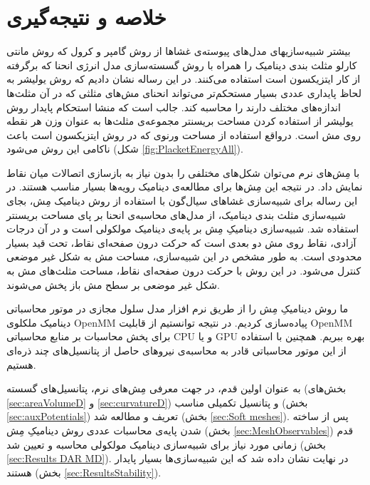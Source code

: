 \section{
خلاصه و نتیجه‌گیری
}
بیشتر شبیه‌سازیهای مدل‌های پیوسته‌ی غشاها از روش گامپر و کرول
\cite{gompper1996}
که  روش مانتی کارلو مثلث بندی دینامیک 
\cite{Boal1992PRA, Gompper1992Science}
را همراه با روش گسسته‌سازی مدل انرژی انحنا که برگرفته از کار ایتزیکسون
\cite{Itzykson1986}
است استفاده می‌کنند. در این رساله نشان دادیم که روش یولیشر
\cite{Julicher1996}
به لحاظ پایداری عددی بسیار مستحکم‌تر می‌تواند انحنای مش‌های مثلثی که در آن مثلث‌ها اندازه‌های مختلف دارند را محاسبه کند.  جالب است که منشا استحکام پایدار روش یولیشر از استفاده کردن مساحت بریسنتر مجموعه‌ی مثلث‌ها به عنوان وزن هر نقطه روی مش است. درواقع استفاده از مساحت ورنوی که در روش ایتزیکسون است باعث ناکامی این روش می‌شود (شکل
\ref{fig:PlacketEnergyAll}).

با مِش‌های نرم می‌توان شکل‌های مختلفی را بدون نیاز به بازسازی اتصالات میان نقاط نمایش داد. در نتیجه این مِش‌ها برای مطالعه‌ی دینامیک رویه‌ها بسیار مناسب هستند. در این رساله برای شبیه‌سازی غشا‌های سیال‌گون با استفاده از روش دینامیک مِش، بجای شبیه‌سازی مثلث بندی دینامیک، از مدل‌های محاسبه‌ی انحنا بر پای مساحت بریسنتر استفاده شد. شبیه‌سازی دینامیکِ مِش بر پایه‌ی دینامیک مولکولی است و در آن درجات آزادی، نقاط روی مش دو بعدی است که حرکت درون صفحه‌ای نقاط، تحت قید بسیار محدودی است. به طور مشخص در این شبیه‌سازی، مساحت‌ مش به شکل غیر موضعی کنترل می‌شود. در این روش با حرکت درون صفحه‌ای نقاط، مساحت مثلث‌های مش به شکل غیر موضعی بر سطح مش باز پخش می‌شوند. 

ما روش دینامیکِ مِش را از طریق نرم افزار مدل سلول مجازی
\cite{VCMgit}
در موتور محاسباتی دینامیک ملکلوی 
OpenMM \cite{OpenMM2017}
پیاده‌سازی کردیم. در نتیجه توانستیم از قابلیت 
OpenMM 
برای پخش محاسبات بر منابع محاسباتی 
CPU
و یا
GPU
بهره ببریم.  همچنین با استفاده از این موتور محاسباتی قادر به محاسبه‌ی نیروهای حاصل از پتانسیل‌های چند ذره‌ای هستیم.

به عنوان اولین قدم، در جهت معرفی مِش‌های نرم، پتانسیل‌های گسسته (بخش‌های
\ref{sec:areaVolumeD}
و
\ref{sec:curvatureD})
و پتانسیل‌ تکمیلی مناسب (بخش
\ref{sec:auxPotentials})
 تعریف و مطالعه شد (بخش
\ref{sec:Soft meshes}).
پس از ساخته شدن پایه‌ی محاسبات عددی روش دینامیکِ مِش (بخش
\ref{sec:MeshObservables})
 قدم زمانی مورد نیاز برای شبیه‌سازی دینامیک مولکولی محاسبه و تعیین شد (بخش
\ref{sec:Results DAR MD}).
در نهایت نشان داده شد که این شبیه‌سازی‌ها بسیار پایدار هستند (بخش
\ref{sec:ResultsStability}).

